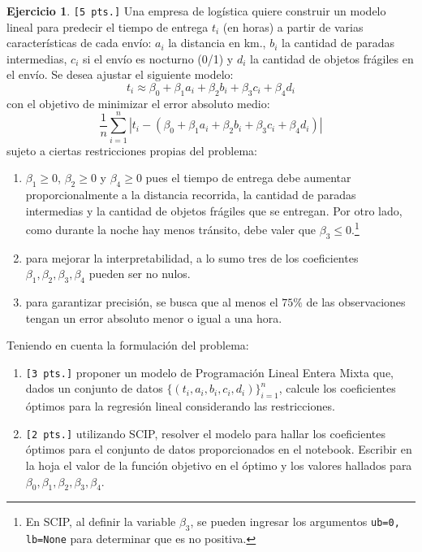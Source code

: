 \documentclass[a4paper,oneside,12pt]{amsart}
\theoremstyle{definition}
\newtheorem{quest}{Ejercicio}
\begin{document}
\begin{quest}
    \texttt{[5 pts.]} Una empresa de logística quiere construir un modelo lineal para predecir el tiempo de entrega
    $t_i$ (en horas) a partir de varias características de cada envío: $a_i$ la distancia en km., $b_i$ la cantidad de
    paradas intermedias, $c_i$ si el envío es nocturno (0/1) y $d_i$ la cantidad de objetos frágiles en el envío. Se
    desea ajustar el siguiente modelo:
    \[t_i \approx \beta_0 + \beta_1 a_i + \beta_2 b_i + \beta_3 c_i + \beta_4 d_i\]
    con el objetivo de minimizar el error absoluto medio:
    \[\frac{1}{n}\sum_{i=1}^n |t_i - (\beta_0 + \beta_1 a_i + \beta_2 b_i + \beta_3 c_i + \beta_4 d_i)|\]
    sujeto a ciertas restricciones propias del problema:
    \begin{enumerate}
        \item $\beta_1\geq 0$, $\beta_2\geq 0$ y $\beta_4\geq 0$ pues el tiempo de entrega debe aumentar
        proporcionalmente a la distancia recorrida, la cantidad de paradas intermedias y la cantidad de objetos
        frágiles que se entregan. Por otro lado, como
        durante la noche hay menos tránsito, debe valer que $\beta_3 \leq 0$.\footnote{En SCIP, al definir la variable
            $\beta_3$, se pueden ingresar los argumentos \texttt{ub=0, lb=None} para determinar que es no positiva.}
        \item para mejorar la interpretabilidad, a lo sumo tres de los coeficientes $\beta_1, \beta_2, \beta_3, \beta_4$
        pueden ser no nulos.
        \item para garantizar precisión, se busca que al menos el $75\%$ de las observaciones tengan un error
        absoluto menor o igual a una hora.
    \end{enumerate}

    Teniendo en cuenta la formulación del problema:
    \begin{enumerate}[label=\alph*)]
        \item \verb|[3 pts.]| proponer un modelo de Programación Lineal Entera Mixta que, dados un conjunto de datos
        $\{(t_i, a_i,b_i,c_i,d_i)\}_{i=1}^n$, calcule los coeficientes óptimos para la regresión lineal considerando
        las restricciones.
        \item \verb|[2 pts.]| utilizando SCIP, resolver el modelo para hallar los coeficientes óptimos para el
        conjunto de datos
        proporcionados en el notebook. Escribir en la hoja el valor de la función objetivo en el óptimo y los valores
        hallados para $\beta_0, \beta_1,\beta_2,\beta_3,\beta_4$.
    \end{enumerate}
\end{quest}


\end{document}
